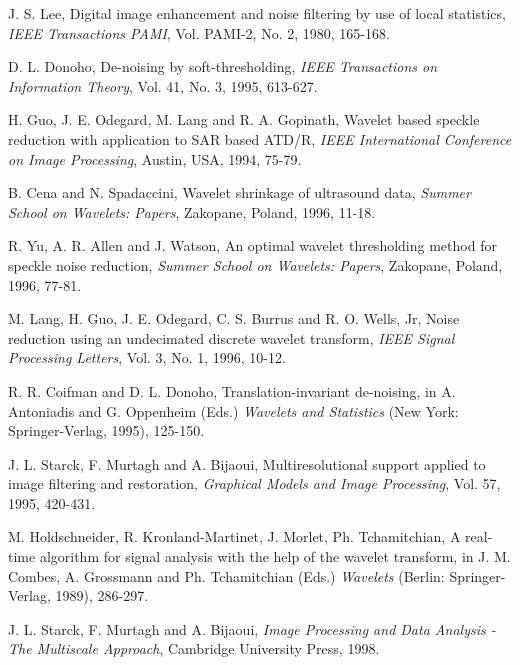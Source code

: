 \documentclass[twocolumn]{article}
\begin{document}
\begin{thebibliography}{00}
	J. S. Lee, Digital image enhancement and noise filtering by use of local
	statistics, \emph{IEEE Transactions PAMI}, Vol. PAMI-2, No. 2, 1980, 165-168.

	D. L. Donoho, De-noising by soft-thresholding,
	\emph{IEEE Transactions on Information Theory}, Vol. 41, No. 3, 1995, 613-627.

	H. Guo, J. E. Odegard, M. Lang and R. A. Gopinath, Wavelet based speckle reduction
	with application to SAR based ATD/R, \emph{IEEE International Conference on Image Processing},
        Austin, USA, 1994, 75-79. 

	B. Cena and N. Spadaccini, Wavelet shrinkage of ultrasound data,
	\emph{Summer School on Wavelets: Papers}, Zakopane, Poland, 1996, 11-18.
	
	R. Yu, A. R. Allen and J. Watson, An optimal wavelet thresholding method
	for speckle noise reduction, \emph{Summer School on Wavelets: Papers},
	Zakopane, Poland, 1996, 77-81.

	M. Lang, H. Guo, J. E. Odegard, C. S. Burrus and R. O. Wells, Jr,
	Noise reduction using an undecimated discrete wavelet transform,
	\emph{IEEE Signal Processing Letters}, Vol. 3, No. 1, 1996, 10-12.

	R. R. Coifman and D. L. Donoho, Translation-invariant de-noising,
	in A. Antoniadis and G. Oppenheim (Eds.) \emph{Wavelets and Statistics} (New York:
	Springer-Verlag, 1995), 125-150.

	J. L. Starck, F. Murtagh and A. Bijaoui, Multiresolutional support 
	applied to image filtering and restoration, \emph{Graphical Models and Image
	Processing}, Vol. 57, 1995, 420-431.

	M. Holdschneider, R. Kronland-Martinet, J. Morlet, Ph. Tchamitchian, 
	A real-time algorithm for signal analysis with the help of the wavelet transform, 
	in J. M. Combes, A. Grossmann and Ph. Tchamitchian (Eds.) \emph{Wavelets} (Berlin:
	Springer-Verlag, 1989), 286-297.

	J. L. Starck, F. Murtagh and A. Bijaoui, \emph{Image Processing and 
	Data Analysis - The Multiscale Approach}, Cambridge University Press, 1998.


\end{thebibliography}
\end{document}
